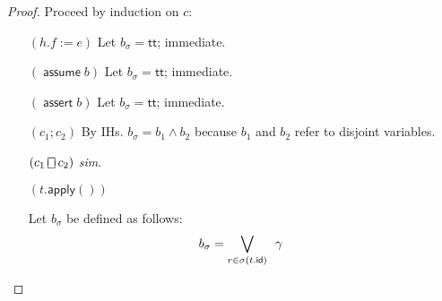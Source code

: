 \documentclass{article}
\newcommand{\TRUE}{\mathsf{tt}}
\newcommand{\id}{\mathsf{id}}
\newcommand{\assert}{\mathop{\mathsf{assert}}}
\newcommand{\assume}{\mathop{\mathsf{assume}}}
\newcommand{\apply}{\mathsf{apply}}
\newcommand{\choiceop}{\rotatebox[origin=c]{90}{$\sqsubset\!\!\!\sqsupset$}}
\newcommand{\choice}{\mathbin{\choiceop}}
\begin{document}
\begin{proof}
  Proceed by induction on $c$:
  \begin{enumerate}[align=left]
  \item[$(h.f:=e)$] Let $b_\sigma = \TRUE$; immediate.
  \item[$(\assume b)$] Let $b_\sigma = \TRUE$; immediate.
  \item[$(\assert b)$] Let $b_\sigma = \TRUE$; immediate.
  \item[$(c_1;c_2)$] By IHs. $b_\sigma = b_1 \wedge b_2$ because $b_1$ and $b_2$ refer to disjoint variables.
  \item[$(c_1 \choice c_2)$] \textit{sim}.
  \item[$(t.\apply())$]

    Let $b_\sigma$ be defined as follows:
    \[
    b_\sigma = \bigvee_{r \in \sigma(t.\id)}
    \begin{array}{>{\displaystyle}l}
      \gamma
    \end{array}
    \]


\end{enumerate}
\end{proof}
\end{document}
